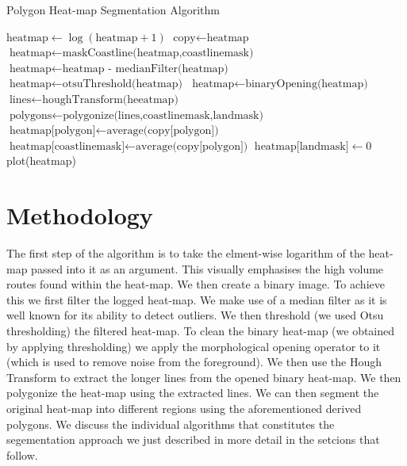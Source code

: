 \documentclass{article}
\begin{document}
\begin{algorithm}
 \caption{Polygon Heat-map Segmentation Algorithm}\label{euclid}
 \begin{algorithmic}[1]
 \State $\textrm{heatmap} \gets \log(\textrm{heatmap}+1)$
 \State $\textrm{copy} \gets \textrm{heatmap}$
 \State $\textrm{heatmap} \gets \textrm{maskCoastline(heatmap,coastlinemask)}$
 \State $\textrm{heatmap} \gets \textrm{heatmap - medianFilter(heatmap)}$ 
 \State $\textrm{heatmap} \gets \textrm{otsuThreshold(heatmap)}$
 \State $\textrm{heatmap} \gets \textrm{binaryOpening(heatmap)}$
 \State $\textrm{lines} \gets \textrm{houghTransform(heeatmap)}$
 \State $\textrm{polygons} \gets \textrm{polygonize(lines,coastlinemask,landmask)}$
     \State $\textrm{heatmap[polygon]} \gets \textrm{average(copy[polygon])}$ 
 \EndFor
 \State $\textrm{heatmap[coastlinemask]} \gets \textrm{average(copy[polygon])}$
 \State $\textrm{heatmap[landmask]} \gets 0$
 \State plot(heatmap)
 
 \EndProcedure
 \end{algorithmic}
 \end{algorithm}
\section{Methodology}
The first step of the algorithm is to take the elment-wise logarithm of the heat-map passed into it as an argument. This visually emphasises the high volume routes found within the heat-map. We then 
create a binary image. To achieve this we first filter the logged heat-map. We make use of a median filter as it is well known for its ability to detect outliers. We then threshold (we used Otsu thresholding) the  
filtered heat-map. To clean the binary heat-map (we obtained by applying thresholding) we apply the morphological opening operator to it (which is used to remove noise from the foreground).
We then use the Hough Transform to extract the longer lines from the opened binary heat-map. We then polygonize the heat-map using the extracted lines. We can then 
segment the original heat-map into different regions using the aforementioned derived polygons. We discuss the individual algorithms that constitutes the segementation approach we 
just described in more detail in the setcions that follow.
\end{document}
